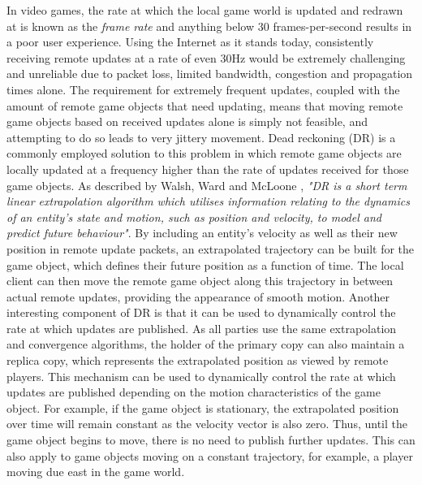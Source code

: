 In video games, the rate at which the local game world is updated and redrawn at is known as the \textit{frame rate} and anything below 30 frames-per-second results in a poor user experience. Using the Internet as it stands today, consistently receiving remote updates at a rate of even 30Hz would be extremely challenging and unreliable due to packet loss, limited bandwidth, congestion and propagation times alone. The requirement for extremely frequent updates, coupled with the amount of remote game objects that need updating, means that moving remote game objects based on received updates alone is simply not feasible, and attempting to do so leads to very jittery movement. Dead reckoning (DR) is a commonly employed solution to this problem in which remote game objects are locally updated at a frequency higher than the rate of updates received for those game objects. As described by Walsh, Ward and McLoone \cite{dead-reckoning}, \textit{"DR is a short term linear extrapolation algorithm which utilises information relating to the dynamics of an entity’s state and motion, such as position and velocity, to model and predict future behaviour"}. By including an entity's velocity as well as their new position in remote update packets, an extrapolated trajectory can be built for the game object, which defines their future position as a function of time. The local client can then move the remote game object along this trajectory in between actual remote updates, providing the appearance of smooth motion. Another interesting component of DR is that it can be used to dynamically control the rate at which updates are published. As all parties use the same extrapolation and convergence algorithms, the holder of the primary copy can also maintain a replica copy, which represents the extrapolated position as viewed by remote players. 
This mechanism can be used to dynamically control the rate at which updates are published depending on the motion characteristics of the game object. For example, if the game object is stationary, the extrapolated position over time will remain constant as the velocity vector is also zero. Thus, until the game object begins to move, there is no need to publish further updates. This can also apply to game objects moving on a constant trajectory, for example, a player moving due east in the game world.

